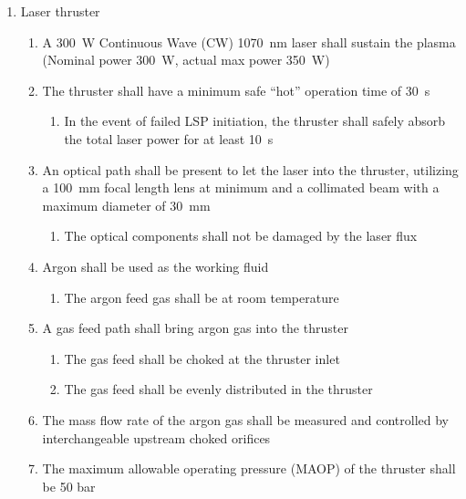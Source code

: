             \begin{enumerate}
                \item Laser thruster
                \begin{enumerate}
                    \item A \qty{300}{W} Continuous Wave (CW) \qty{1070}{nm} laser shall sustain the plasma (Nominal power \qty{300}{W}, actual max power \qty{350}{W})
                    \item The thruster shall have a minimum safe “hot” operation time of \qty{30}{s}
                    \begin{enumerate}
                        \item In the event of failed LSP initiation, the thruster shall safely absorb the total laser power for at least \qty{10}{s}
                    \end{enumerate}
                    \item An optical path shall be present to let the laser into the thruster, utilizing a \qty{100}{mm} focal length lens at minimum and a collimated beam with a maximum diameter of \qty{30}{mm}
                    \begin{enumerate}
                        \item The optical components shall not be damaged by the laser flux
                    \end{enumerate}
                    \item Argon shall be used as the working fluid
                    \begin{enumerate}
                        \item The argon feed gas shall be at room temperature
                    \end{enumerate}
                    \item A gas feed path shall bring argon gas into the thruster
                    \begin{enumerate}
                        \item The gas feed shall be choked at the thruster inlet
                        \item The gas feed shall be evenly distributed in the thruster
                    \end{enumerate}
                    \item The mass flow rate of the argon gas shall be measured and controlled by interchangeable upstream choked orifices
                    \item The maximum allowable operating pressure (MAOP) of the thruster shall be 50 bar

\end{enumerate}
\end{enumerate}
